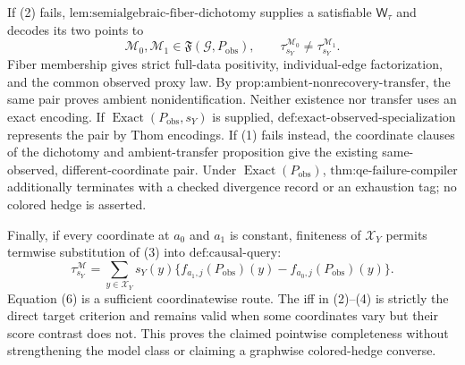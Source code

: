 If (2) fails, \(\text{lem:semialgebraic-fiber-dichotomy}\) supplies a satisfiable \(\mathsf W_{\tau}\) and decodes its two points to
\[
\mathcal M_0,\mathcal M_1\in\mathfrak F(\mathcal G,P_{\mathrm{obs}}),
\qquad
\tau_{s_Y}^{\mathcal M_0}\neq\tau_{s_Y}^{\mathcal M_1}.
\tag{5}
\]
Fiber membership gives strict full-data positivity, individual-edge factorization, and the common observed proxy law. By \(\text{prop:ambient-nonrecovery-transfer}\), the same pair proves ambient nonidentification. Neither existence nor transfer uses an exact encoding. If \(\operatorname{Exact}(P_{\mathrm{obs}},s_Y)\) is supplied, \(\text{def:exact-observed-specialization}\) represents the pair by Thom encodings. If (1) fails instead, the coordinate clauses of the dichotomy and ambient-transfer proposition give the existing same-observed, different-coordinate pair. Under \(\operatorname{Exact}(P_{\mathrm{obs}})\), \(\text{thm:qe-failure-compiler}\) additionally terminates with a checked divergence record or an exhaustion tag; no colored hedge is asserted.

Finally, if every coordinate at \(a_0\) and \(a_1\) is constant, finiteness of \(\mathcal X_Y\) permits termwise substitution of (3) into \(\text{def:causal-query}\):
\[
\tau_{s_Y}^{\mathcal M}
=\sum_{y\in\mathcal X_Y}s_Y(y)
\{f_{a_1,j}(P_{\mathrm{obs}})(y)-f_{a_0,j}(P_{\mathrm{obs}})(y)\}.
\tag{6}
\]
Equation (6) is a sufficient coordinatewise route. The iff in (2)--(4) is strictly the direct target criterion and remains valid when some coordinates vary but their score contrast does not. This proves the claimed pointwise completeness without strengthening the model class or claiming a graphwise colored-hedge converse.
